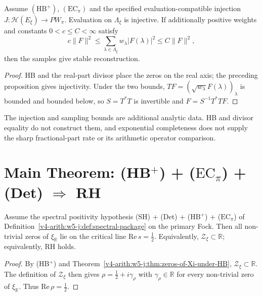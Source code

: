 \begin{corollary}
\label{v4-arith:w5-j:cor:zeros-sample}
Assume \((\mathrm{HB}^+)\), \((\mathrm{EC}_\pi)\) and the
specified evaluation-compatible injection
\(J:\mathcal H(E_\xi)\to PW_\pi\).
Evaluation on \(\Lambda_\xi\) is injective. If additionally
positive weights and constants \(0<c\le C<\infty\) satisfy
\[
 c\|F\|^2\le\sum_{\lambda\in\Lambda_\xi}w_\lambda|F(\lambda)|^2
              \le C\|F\|^2,
\]
then the samples give stable reconstruction.
\end{corollary}
\begin{proof}
HB and the real-part divisor place the zeros on the real axis;
the preceding proposition gives injectivity. Under the two bounds,
\(TF=(\sqrt{w_\lambda}F(\lambda))_\lambda\) is bounded and bounded
below, so \(S=T^*T\) is invertible and \(F=S^{-1}T^*TF\).
\end{proof}
The injection and sampling bounds are additional analytic data.
HB and divisor equality do not construct them, and exponential
completeness does not supply the sharp fractional-part rate or its
arithmetic operator comparison.

\section{Main Theorem: (HB\(^{+}\)) + (\(\mathrm{EC}_\pi\)) + (Det) \(\Rightarrow\) RH}
\label{v4-arith:w5-j:main-theorem}

\begin{theorem}
\label{v4-arith:w5-j:thm:VBstar-main-direction}
Assume the spectral positivity hypothesis
(SH) + (Det) + (HB\(^{+}\)) + (\(\mathrm{EC}_\pi\)) of
Definition~\ref{v4-arith:w5-j:def:spectral-package} on the primary Fock.
Then all non-trivial zeros of \(\xi_{\mathbb R}\) lie on the
critical line \(\mathrm{Re}\,s=\tfrac{1}{2}\). Equivalently,
\(\mathcal{Z}_{\xi}\subset\mathbb{R}\); equivalently, RH holds.
\end{theorem}

\begin{proof}
By (HB\(^{+}\)) and
Theorem~\ref{v4-arith:w5-j:thm:zeros-of-Xi-under-HB},
\(\mathcal{Z}_{\xi}\subset\mathbb{R}\).
The definition of \(\mathcal{Z}_{\xi}\) then gives
\(\rho=\tfrac{1}{2}+i\gamma_{\rho}\) with
\(\gamma_{\rho}\in\mathbb{R}\) for every non-trivial zero of
\(\xi_{\mathbb R}\).  Thus \(\mathrm{Re}\,\rho=\tfrac{1}{2}\).
\end{proof}

